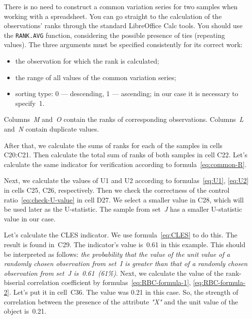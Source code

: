 \documentclass[]{scrreprt}
\begin{document}
There is no need to construct a common variation series for two samples when working with a spreadsheet. You can go straight to the calculation of the observations' ranks through the standard LibreOffice Calc tools. You should use the \texttt{RANK.AVG} function, considering the possible presence of ties (repeating values). The three arguments must be specified consistently for its correct work:
\begin{itemize}
	\item the observation for which the rank is calculated;
	\item the range of all values of the common variation series;
	\item sorting type: 0 --- descending, 1 --- ascending; in our case it is necessary to specify~1.
\end{itemize}
Columns~\textit{M} and~\textit{O} contain the ranks of corresponding observations. Columns~\textit{L} and~\textit{N} contain duplicate values.

After that, we calculate the sums of ranks for each of the samples in cells C20:C21. Then calculate the total sum of ranks of both samples in cell C22. Let's calculate the same indicator for verification according to formula~\ref{eq:common-R}.

Next, we calculate the values of U1 and U2 according to formulas~\ref{eq:U1}, \ref{eq:U2} in cells C25, C26, respectively. Then we check the correctness of the control ratio~\ref{eq:check-U-value} in cell D27. We select a smaller value in C28, which will be used later as the U-statistic. The sample from set~\textit{J} has a smaller U-statistic value in our case.

Let's calculate the CLES indicator. We use formula~\ref{eq:CLES} to do this. The result is found in~C29. The indicator's value is~0.61 in this example. This should be interpreted as follows: \emph{the probability that the value of the unit value of a randomly chosen observation from set~\textit{I} is greater than that of a randomly chosen observation from set~\textit{J} is~0.61~(61\%)}. Next, we calculate the value of the rank-biserial correlation coefficient by formulas~\ref{eq:RBC-formula-1}, \ref{eq:RBC-formula-2}. Let's put it in cell~C36. The value was 0.21 in this case. So, the strength of correlation between the presence of the attribute \textit{"X"} and the unit value of the object is~0.21.
\end{document}
